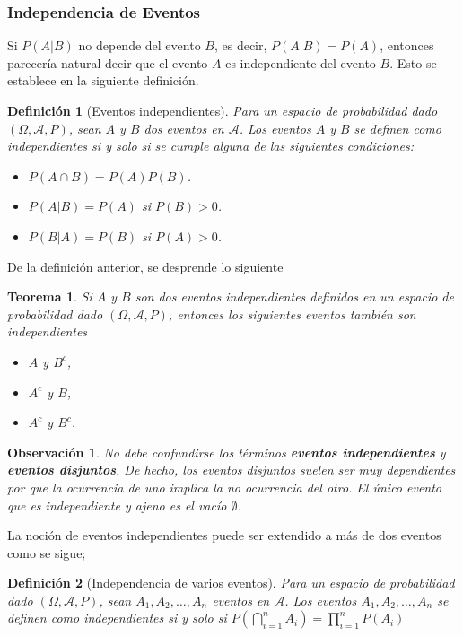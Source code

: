 \documentclass[12pt]{article}
\newtheorem{theorem}{Teorema}[section]
\newtheorem*{remark}{Observación}
\newtheorem{definition}{Definición}
\begin{document}
\subsubsection{Independencia de Eventos}
Si $P(A|B)$ no depende del evento $B$, es decir, $P(A|B)=P(A)$, entonces parecería natural decir que el evento $A$ es independiente del evento $B$. Esto se establece en la siguiente definición.
\begin{definition}[Eventos independientes]
    Para un espacio de probabilidad dado $(\Omega, \mathscr A, P)$, sean $A$ y $B$ dos eventos en $\mathscr A$. Los eventos $A$ y $B$ se definen como \textit{independientes} si y solo si se cumple alguna de las siguientes condiciones:
    \begin{itemize}
        \item[(i)] $P(A\cap B)= P(A)P(B)$.
        \item[(ii)] $P(A|B)=P(A)$ si $P(B)>0$.
        \item[(iii)]  $P(B|A)=P(B)$ si $P(A)>0$.
    \end{itemize}
\end{definition}
De la definición anterior, se desprende lo siguiente
\begin{theorem}
    Si $A$ y $B$ son dos eventos independientes definidos en un espacio de probabilidad dado $(\Omega, \mathscr A, P)$, entonces los siguientes eventos también son independientes
    \begin{itemize}
        \item[(i)] $A$ y $B^c$, 
        \item[(ii)] $A^c$ y $B$,
        \item[(iii)] $A^c$ y $B^c$.
    \end{itemize}
\end{theorem}
\begin{remark}
    No debe confundirse los términos \textbf{eventos independientes} y \textbf{eventos disjuntos}. De hecho, los eventos disjuntos suelen ser muy dependientes por que la ocurrencia de uno implica la no ocurrencia del otro. El único evento que es independiente y ajeno es el vacío $\emptyset$.
\end{remark}

La noción de eventos independientes puede ser extendido a más de dos eventos como se sigue;
\begin{definition}[Independencia de varios eventos]
    Para un espacio de probabilidad dado $(\Omega, \mathscr A, P)$, sean $A_1, A_2, \ldots, A_n$ eventos en $\mathscr A$. Los eventos $A_1, A_2, \ldots, A_n$ se definen como independientes si y solo si $P\left(\bigcap\limits_{i=1}^n A_i\right)=\prod\limits_{i=1}^n P(A_i)$
\end{definition}
\end{document}
